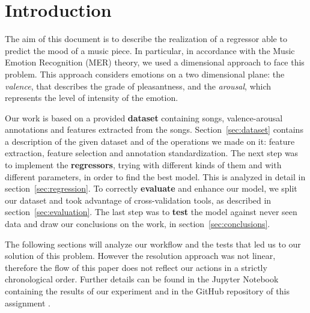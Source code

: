 \section{Introduction}

The aim of this document is to describe the realization of a regressor able to predict the mood of a music piece. In particular, in accordance with the Music Emotion Recognition (MER) theory, we used a dimensional approach to face this problem. This approach considers emotions on a two dimensional plane: the \emph{valence}, that describes the grade of pleasantness, and the \emph{arousal}, which represents the level of intensity of the emotion.

Our work is based on a provided \textbf{dataset} containing songs, valence-arousal annotations and features extracted from the songs. Section~\ref{sec:dataset} contains a description of the given dataset and of the operations we made on it: feature extraction, feature selection and annotation standardization.
The next step was to implement the \textbf{regressors}, trying with different kinds of them and with different parameters, in order to find the best model. This is analyzed in detail in section~\ref{sec:regression}.
To correctly \textbf{evaluate} and enhance our model, we split our dataset and took advantage of cross-validation tools, as described in section~\ref{sec:evaluation}.
The last step was to \textbf{test} the model against never seen data and draw our conclusions on the work, in section~\ref{sec:conclusions}.

The following sections will analyze our workflow and the tests that led us to our solution of this problem. However the resolution approach was not linear, therefore the flow of this paper does not reflect our actions in a strictly chronological order. Further details can be found in the Jupyter Notebook containing the results of our experiment \cite{notebook} and in the GitHub repository of this assignment \cite{github}.

